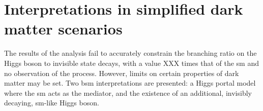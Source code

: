 




\section{Interpretations in simplified dark matter scenarios}
\label{sec:htoinv_dark_matter_models}

The results of the analysis fail to accurately constrain the branching ratio on the Higgs boson to invisible state decays, with a value XXX times that of the \acrlong{sm} and no observation of the process. However, limits on certain properties of dark matter may be set. Two \acrshort{bsm} interpretations are presented: a Higgs portal model where the \acrshort{sm} acts as the mediator, and the existence of an additional, invisibly decaying, \acrshort{sm}-like Higgs boson.


